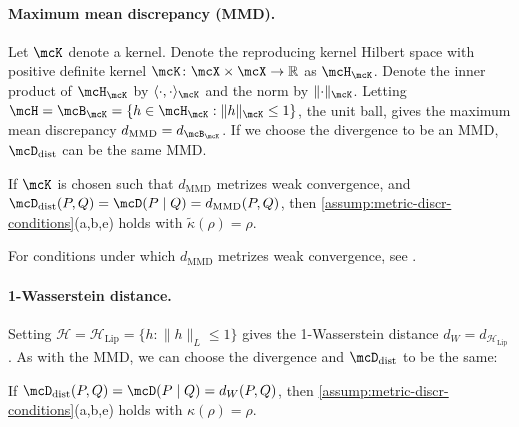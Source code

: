 \paragraph{Maximum mean discrepancy (MMD).}
Let $\mcK $ denote a kernel.
Denote the reproducing kernel Hilbert space with positive definite kernel $\mcK \colon \mcX \times \mcX \to \reals$ as $\mcH_{\mcK}$.
Denote the inner product of $\mcH_{\mcK}$ by $\langle{\cdot},{\cdot}\rangle_{\mcK}$ and the norm by $\|{\cdot}\|_{\mcK}$.
Letting $\mcH = \mcB_{\mcK} = \{ h \in \mcH_{\mcK} :  \|h\|_{\mcK} \le 1\}$, the unit ball, gives the maximum mean discrepancy $d_{\mathrm{MMD}} = d_{\mcB_{\mcK}}$.
If we choose the divergence to be an MMD, $\distDisc$ can be the same MMD.
\begin{proposition} 	\label{coro:MMD}
	If $\mcK$ is chosen such that $d_{\mathrm{MMD}}$ metrizes weak convergence, and
	$\distDisc(P, Q) =  \discr{P}{Q} = d_{\mathrm{MMD}}(P,Q)$,
	then \cref{assump:metric-discr-conditions}(a,b,e) holds with $\widetilde\kappa(\rho) = \rho$.
\end{proposition}

For conditions under which $d_{\mathrm{MMD}}$ metrizes weak convergence, see
\citet{Sriperumbudur:2010,Simon:2020}.

\paragraph{1-Wasserstein distance.}
Setting $\mathcal{H} = \mathcal{H}_{\text{Lip}} = \{ h : \| h \|_L \leq 1 \}$ gives the 1-Wasserstein distance $d_W = d_{\mathcal{H}_{\text{Lip}}}$.
As with the MMD, we can choose the divergence and $\distDisc$ to be the same:
\begin{proposition}
	\label{prop:wasserstein}
	If $\distDisc(P, Q) = \discr{P}{Q} = d_W(P, Q)$, then \cref{assump:metric-discr-conditions}(a,b,e) holds with $\kappa(\rho) = \rho$.
\end{proposition}


